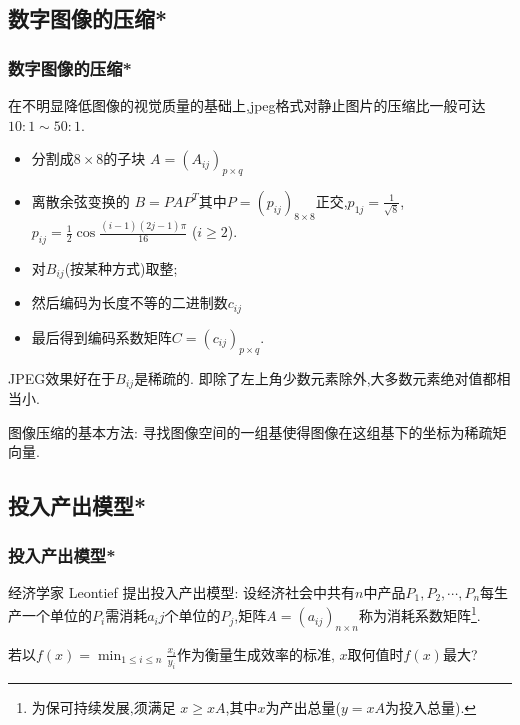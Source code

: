     \subsection{数字图像的压缩*}
\begin{frame}\frametitle{数字图像的压缩*}
    在不明显降低图像的视觉质量的基础上,jpeg格式对静止图片的压缩比一般可达$10:1\sim 50:1$.
    \begin{itemize}
    \item 分割成$8\times8$的子块 $A=(A_{ij})_{p\times q}$
    \item 离散余弦变换的 $B=PAP^T$其中$P=(p_{ij})_{8\times 8}$正交,$p_{1j}=\frac{1}{\sqrt{8}}$, $p_{ij}=\frac12\cos\frac{(i-1)(2j-1)\pi}{16}$ ($i\geq2$).
    \item 对$B_{ij}$(按某种方式)取整;
    \item 然后编码为长度不等的二进制数$c_{ij}$
    \item 最后得到编码系数矩阵$C=(c_{ij})_{p\times q}$.

    \end{itemize}
    \bigskip
    JPEG效果好在于$B_{ij}$是稀疏的. 即除了左上角少数元素除外,大多数元素绝对值都相当小.

    \bigskip
    图像压缩的基本方法: 寻找图像空间的一组基使得图像在这组基下的坐标为稀疏矩向量.
    \end{frame}





    \subsection{投入产出模型*}
\begin{frame}\frametitle{投入产出模型*}
    经济学家 Leontief 提出投入产出模型: 设经济社会中共有$n$中产品$P_1,P_2,\cdots,P_n$每生产一个单位的$P_i$需消耗$a_ij$个单位的$P_j$,矩阵$A=(a_{ij})_{n\times n}$称为消耗系数矩阵\footnote{为保可持续发展,须满足 $x \geq xA$,其中$x$为产出总量($y=xA$为投入总量).}.

    \begin{question}
    若以$f(x)=\min_{1\leq i\leq n}\frac{x_i}{y_i}$作为衡量生成效率的标准, $x$取何值时$f(x)$最大?
    \end{question}
    \end{frame}





